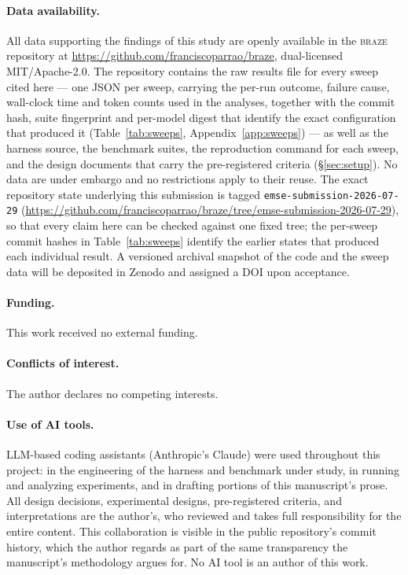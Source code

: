 \documentclass[smallcondensed,natbib]{svjour3}
\newcommand{\braze}{\textsc{braze}}
\begin{document}
\paragraph{Data availability.} All data supporting the findings of this
study are openly available in the \braze{} repository at
\url{https://github.com/franciscoparrao/braze}, dual-licensed
MIT/Apache-2.0. The repository contains the raw results file for every
sweep cited here --- one JSON per sweep, carrying the per-run outcome,
failure cause, wall-clock time and token counts used in the analyses,
together with the commit hash, suite fingerprint and per-model digest
that identify the exact configuration that produced it
(Table~\ref{tab:sweeps}, Appendix~\ref{app:sweeps}) --- as well as the
harness source, the benchmark suites, the reproduction command for each
sweep, and the design documents that carry the pre-registered criteria
(\S\ref{sec:setup}). No data are under embargo and no restrictions
apply to their reuse. The exact repository state underlying this
submission is tagged \texttt{emse-submission-2026-07-29}
(\url{https://github.com/franciscoparrao/braze/tree/emse-submission-2026-07-29}),
so that every claim here can be checked against one fixed tree; the
per-sweep commit hashes in Table~\ref{tab:sweeps} identify the earlier
states that produced each individual result. A versioned archival
snapshot of the code and the sweep data will be deposited in Zenodo and
assigned a DOI upon acceptance.

\paragraph{Funding.} This work received no external funding.

\paragraph{Conflicts of interest.} The author declares no competing
interests.

\paragraph{Use of AI tools.} LLM-based coding assistants (Anthropic's
Claude) were used throughout this project: in the engineering of the
harness and benchmark under study, in running and analyzing
experiments, and in drafting portions of this manuscript's prose. All
design decisions, experimental designs, pre-registered criteria, and
interpretations are the author's, who reviewed and takes full
responsibility for the entire content. This collaboration is visible in
the public repository's commit history, which the author regards as
part of the same transparency the manuscript's methodology argues for.
No AI tool is an author of this work.
\end{document}
